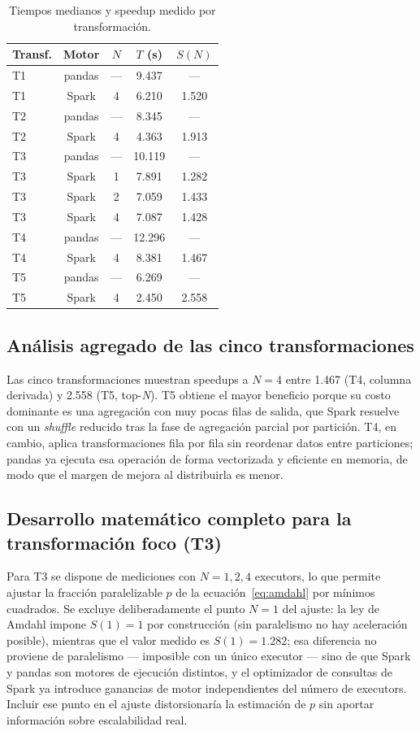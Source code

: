 \documentclass[11pt]{article}
\begin{document}
\begin{table}[h]
\centering
\caption{Tiempos medianos y speedup medido por transformación.}
\label{tab:tiempos}
\begin{tabular}{lccS[table-format=2.3]S[table-format=1.3]}
\toprule
Transf. & Motor & $N$ & {$T$ (\si{\second})} & {$S(N)$} \\
\midrule
T1 & pandas & --- & 9.437  & --- \\
T1 & Spark  & 4    & 6.210  & 1.520 \\
T2 & pandas & --- & 8.345  & --- \\
T2 & Spark  & 4    & 4.363  & 1.913 \\
T3 & pandas & --- & 10.119 & --- \\
T3 & Spark  & 1    & 7.891  & 1.282 \\
T3 & Spark  & 2    & 7.059  & 1.433 \\
T3 & Spark  & 4    & 7.087  & 1.428 \\
T4 & pandas & --- & 12.296 & --- \\
T4 & Spark  & 4    & 8.381  & 1.467 \\
T5 & pandas & --- & 6.269  & --- \\
T5 & Spark  & 4    & 2.450  & 2.558 \\
\bottomrule
\end{tabular}
\end{table}

\subsection{Análisis agregado de las cinco transformaciones}

Las cinco transformaciones muestran speedups a $N=4$ entre 1.467 (T4,
columna derivada) y 2.558 (T5, top-\emph{N}). T5 obtiene el mayor
beneficio porque su costo dominante es una agregación con muy pocas
filas de salida, que Spark resuelve con un \emph{shuffle} reducido tras
la fase de agregación parcial por partición. T4, en cambio, aplica
transformaciones fila por fila sin reordenar datos entre particiones;
pandas ya ejecuta esa operación de forma vectorizada y eficiente en
memoria, de modo que el margen de mejora al distribuirla es menor.

\subsection{Desarrollo matemático completo para la transformación foco (T3)}

Para T3 se dispone de mediciones con $N=1,2,4$ executors, lo que permite
ajustar la fracción paralelizable $p$ de la ecuación~\eqref{eq:amdahl}
por mínimos cuadrados. Se excluye deliberadamente el punto $N=1$ del
ajuste: la ley de Amdahl impone $S(1)=1$ por construcción (sin
paralelismo no hay aceleración posible), mientras que el valor medido es
$S(1)=1.282$; esa diferencia no proviene de paralelismo --- imposible
con un único executor --- sino de que Spark y pandas son motores de
ejecución distintos, y el optimizador de consultas de Spark ya introduce
ganancias de motor independientes del número de executors. Incluir ese
punto en el ajuste distorsionaría la estimación de $p$ sin aportar
información sobre escalabilidad real.
\end{document}
